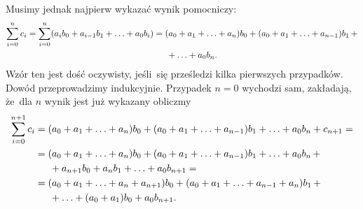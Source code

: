 \documentclass[a4paper,11pt]{article}
\numberwithin{equation}{section}
\begin{document}
Musimy jednak najpierw wykazać wynik pomocniczy:
\begin{equation}
  \label{eq:Leja-Funkcje-zespolone-22}
  \begin{split}
    \sum_{ i = 0 }^{ n } c_{ i } =
    \sum_{ i = 0 }^{ n } ( a_{ i } b_{ 0 } + a_{ i - 1 } b_{ 1 } + \ldots
    + a_{ 0 } b_{ i } )
    &= ( a_{ 0 } + a_{ 1 } + \ldots + a_{ n } ) b_{ 0 } + ( a_{ 0 } + a_{ 1 }
      + \ldots + a_{ n - 1 } ) b_{ 1 } \, + \\
    &\hspace{1.5em} + \ldots + a_{ 0 } b_{ n }.
  \end{split}
\end{equation}
Wzór ten jest dość oczywisty, jeśli~się prześledzi kilka pierwszych
przypadków. Dowód przeprowadzimy indukcyjnie. Przypadek $n = 0$
wychodzi sam, zakładają, że~dla $n$ wynik jest już wykazany obliczmy
\begin{equation}
  \label{eq:Leja-Funkcje-zespolone-23}
  \begin{split}
    \sum_{ i = 0 }^{ n + 1 } c_{ i }
    &= ( a_{ 0 } + a_{ 1 } + \ldots +
      a_{ n } ) b_{ 0 } + ( a_{ 0 } + a_{ 1 } + \ldots + a_{ n - 1 } )
      b_{ 1 } + \ldots + a_{ 0 } b_{ n } + c_{ n + 1 } = \\
    &= ( a_{ 0 } + a_{ 1 } + \ldots + a_{ n } ) b_{ 0 } + ( a_{ 0 } + a_{ 1 }
      + \ldots + a_{ n - 1 } ) b_{ 1 } + \ldots + a_{ 0 } b_{ n } \, + \\
    &\hspace{1.5em}
      + a_{ n + 1 } b_{ 0 } + a_{ n } b_{ 1 } + \ldots + a_{ 0 } b_{ n + 1 } = \\
    &= ( a_{ 0 } + a_{ 1 } + \ldots + a_{ n } + a_{ n + 1 } ) b_{ 0 } +
      ( a_{ 0 } + a_{ 1 } + \ldots + a_{ n - 1 } + a_{ n } ) b_{ 1 } \, + \\
    &\hspace{1.5em}
      + \ldots + ( a_{ 0 } + a_{ 1 } ) b_{ 0 } + a_{ 0 } b_{ n + 1 }.
  \end{split}
\end{equation}
\end{document}

